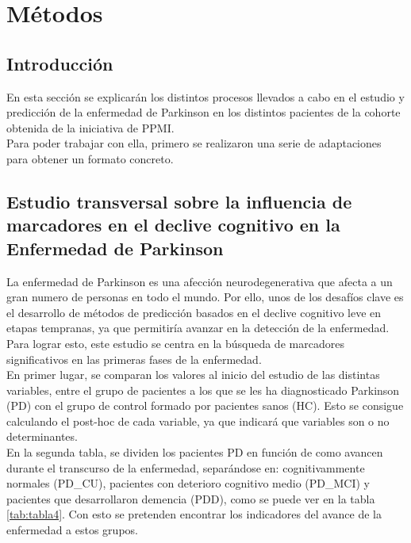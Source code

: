 \chapter{Métodos}

\section{Introducción}
En esta sección se explicarán los distintos procesos llevados a cabo en el estudio y predicción de la enfermedad de Parkinson en los distintos pacientes de la cohorte obtenida de la iniciativa de PPMI.\\

Para poder trabajar con ella, primero se realizaron una serie de adaptaciones para obtener un formato concreto.


\section{Estudio transversal sobre la influencia de marcadores en el declive cognitivo en la Enfermedad de Parkinson}

La enfermedad de Parkinson es una afección neurodegenerativa que afecta a un gran numero de personas en todo el mundo. Por ello, unos de los desafíos clave es el desarrollo de métodos de predicción basados en el declive cognitivo leve en etapas tempranas, ya que permitiría avanzar en la detección de la enfermedad. Para lograr esto, este estudio se centra en la búsqueda de marcadores significativos en las primeras fases de la enfermedad.\\

En primer lugar, se comparan los valores al inicio del estudio de las distintas variables, entre el grupo de pacientes a los que se les ha diagnosticado Parkinson (PD) con el grupo de control formado por pacientes sanos (HC). Esto se consigue calculando el post-hoc de cada variable, ya que indicará que variables son o no determinantes.\\

En la segunda tabla, se dividen los pacientes PD en función de como avancen durante el transcurso de la enfermedad, separándose en: cognitivammente normales (PD\_CU), pacientes con deterioro cognitivo medio (PD\_MCI) y pacientes que desarrollaron demencia (PDD), como se puede ver en la tabla \ref{tab:tabla4}. Con esto se pretenden encontrar los indicadores del avance de la enfermedad a estos grupos.\\

